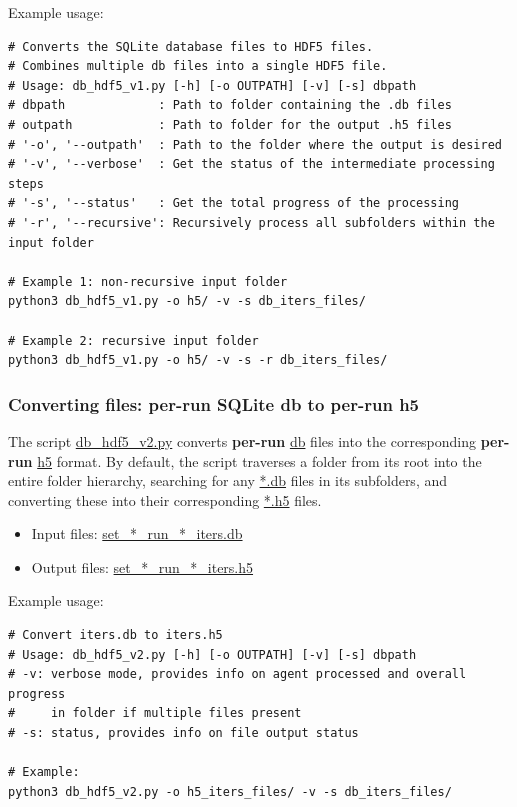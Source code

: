 \documentclass[10pt,a4paper]{article}
\begin{document}
Example usage:
\begin{verbatim}
# Converts the SQLite database files to HDF5 files.
# Combines multiple db files into a single HDF5 file.
# Usage: db_hdf5_v1.py [-h] [-o OUTPATH] [-v] [-s] dbpath
# dbpath             : Path to folder containing the .db files
# outpath            : Path to folder for the output .h5 files
# '-o', '--outpath'  : Path to the folder where the output is desired
# '-v', '--verbose'  : Get the status of the intermediate processing steps
# '-s', '--status'   : Get the total progress of the processing
# '-r', '--recursive': Recursively process all subfolders within the input folder

# Example 1: non-recursive input folder
python3 db_hdf5_v1.py -o h5/ -v -s db_iters_files/

# Example 2: recursive input folder
python3 db_hdf5_v1.py -o h5/ -v -s -r db_iters_files/
\end{verbatim}

\subsubsection{Converting files: per-run SQLite db to per-run h5}
The script \url{db_hdf5_v2.py} converts \textbf{per-run} \url{db} files into the corresponding \textbf{per-run} \url{h5} format. By default, the script traverses a folder from its root into the entire folder hierarchy, searching for any \url{*.db} files in its subfolders, and converting these into their corresponding \url{*.h5} files.
\begin{itemize}
\item Input files: \url{set_*_run_*_iters.db}

\item Output files: \url{set_*_run_*_iters.h5}
\end{itemize}

Example usage:
\begin{verbatim}
# Convert iters.db to iters.h5
# Usage: db_hdf5_v2.py [-h] [-o OUTPATH] [-v] [-s] dbpath
# -v: verbose mode, provides info on agent processed and overall progress
#     in folder if multiple files present
# -s: status, provides info on file output status

# Example:
python3 db_hdf5_v2.py -o h5_iters_files/ -v -s db_iters_files/
\end{verbatim}
\end{document}
